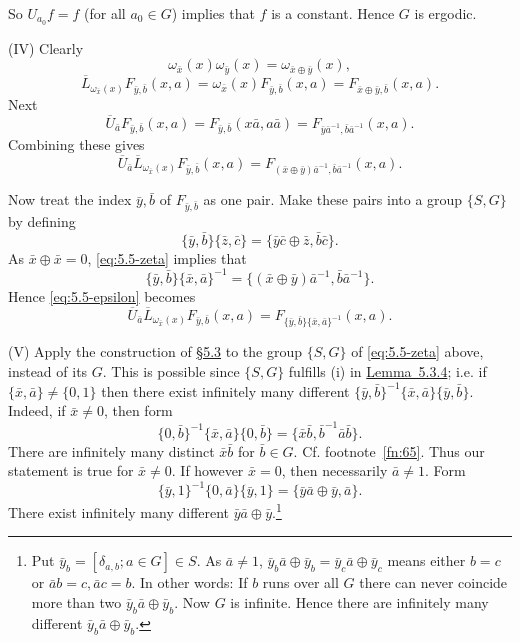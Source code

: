 \documentclass[b5paper,twoside]{article}
\newcommand{\secref}[2]{\hyperref[#1]{\mbox{\S#2}}}
\newcommand{\lemref}[2]{\hyperref[#1]{\mbox{Lemma~#2}}}
\theoremstyle{mvnplain}
\def\mathfrak#1{#1}%
\begin{document}
So \(U_{a_0}f=f\) (for all \(a_0\in\mathfrak G\)) implies that \(f\) is a
constant. Hence \(\mathfrak G\) is ergodic.

(IV) Clearly
\[
 \omega_{\bar x}(x)\omega_{\bar y}(x)=
 \omega_{\bar x\oplus\bar y}(x),
\]
\[
 \overline L_{\omega_{\bar x}(x)}F_{\bar y,\bar b}(x,a)
 =\omega_{\bar x}(x)F_{\bar y,\bar b}(x,a)
 =F_{\bar x\oplus\bar y,\bar b}(x,a).
\]
Next
\[
 \overline U_{\bar a}F_{\bar y,\bar b}(x,a)
 =F_{\bar y,\bar b}(x\bar a,a\bar a)
 =F_{\bar y\bar a^{-1},\bar b\bar a^{-1}}(x,a).
\]
Combining these gives
\begin{equation}\tag{5.5.\(\epsilon\)}\label{eq:5.5-epsilon}
 \overline U_{\bar a}\overline L_{\omega_{\bar x}(x)}
 F_{\bar y,\bar b}(x,a)
 =F_{(\bar x\oplus\bar y)\bar a^{-1},\bar b\bar a^{-1}}(x,a).
\end{equation}

Now treat the index \(\bar y,\bar b\) of \(F_{\bar y,\bar b}\) as one pair.
Make these pairs into a group \(\{\mathfrak S,\mathfrak G\}\) by defining
\begin{equation}\tag{5.5.\(\zeta\)}\label{eq:5.5-zeta}
 \{\bar y,\bar b\}\{\bar z,\bar c\}
 =\{\bar y\bar c\oplus\bar z,\bar b\bar c\}.
\end{equation}
As \(\bar x\oplus\bar x=0\), \eqref{eq:5.5-zeta} implies that
\[
 \{\bar y,\bar b\}\{\bar x,\bar a\}^{-1}
 =\{(\bar x\oplus\bar y)\bar a^{-1},\bar b\bar a^{-1}\}.
\]
Hence \eqref{eq:5.5-epsilon} becomes
\begin{equation}\tag{5.5.\(\eta\)}\label{eq:5.5-eta}
 \overline U_{\bar a}\overline L_{\omega_{\bar x}(x)}
 F_{\bar y,\bar b}(x,a)
 =F_{\{\bar y,\bar b\}\{\bar x,\bar a\}^{-1}}(x,a).
\end{equation}

(V) Apply the construction of \secref{sec:5.3}{5.3} to the group
\(\{\mathfrak S,\mathfrak G\}\) of \eqref{eq:5.5-zeta} above, instead of
its \(\mathfrak G\). This is possible since
\(\{\mathfrak S,\mathfrak G\}\) fulfills (i) in
\lemref{lem:5.3.4}{5.3.4}; i.e. if
\(\{\bar x,\bar a\}\ne\{0,1\}\) then there exist infinitely many different
\(\{\bar y,\bar b\}^{-1}\{\bar x,\bar a\}\{\bar y,\bar b\}\). Indeed, if
\(\bar x\ne0\), then form
\[
 \{0,\bar b\}^{-1}\{\bar x,\bar a\}\{0,\bar b\}
 =\{\bar x\bar b,\bar b^{-1}\bar a\bar b\}.
\]
There are infinitely many distinct \(\bar x\bar b\) for
\(\bar b\in\mathfrak G\). Cf. footnote~\ref{fn:65}. Thus our statement is true for
\(\bar x\ne0\). If however \(\bar x=0\), then necessarily \(\bar a\ne1\).
Form
\[
 \{\bar y,1\}^{-1}\{0,\bar a\}\{\bar y,1\}
 =\{\bar y\bar a\oplus\bar y,\bar a\}.
\]
There exist infinitely many different \(\bar y\bar a\oplus\bar y\).\footnote{
Put \(\bar y_b=[\delta_{a,b};a\in\mathfrak G]\in\mathfrak S\). As
\(\bar a\ne1\),
\(\bar y_b\bar a\oplus\bar y_b=\bar y_c\bar a\oplus\bar y_c\) means either
\(b=c\) or \(\bar ab=c,\bar ac=b\). In other words: If \(b\) runs over all
\(\mathfrak G\) there can never coincide more than two
\(\bar y_b\bar a\oplus\bar y_b\). Now \(\mathfrak G\) is infinite. Hence
there are infinitely many different \(\bar y_b\bar a\oplus\bar y_b\).}
\end{document}
